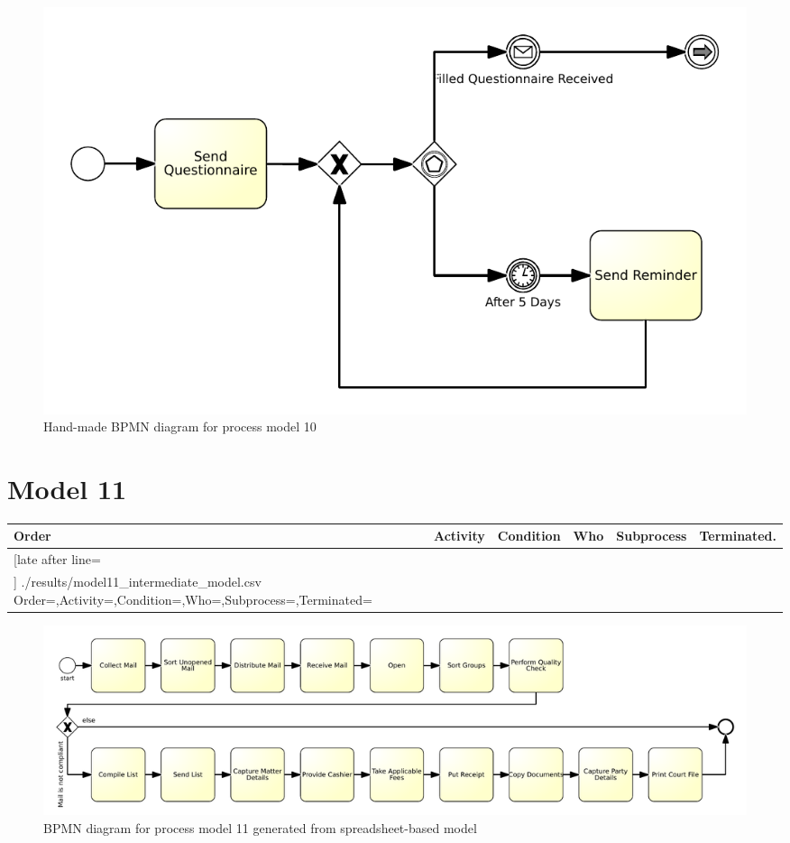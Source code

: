 \begin{figure}[H]
	\centering
	\includegraphics[width=\hsize]{./bpmn/model10.pdf}
	\caption{Hand-made BPMN diagram for process model 10}
	\label{bpmn:model10}
\end{figure}

\section{Model 11}
\begin{tcolorbox}[
	breakable,
	arc=0mm,
	left=1pt,
	right = 1pt,
	boxrule=0mm,
	colback = {white},
	]
	\texttt{}
\end{tcolorbox}
\label{txt:model11}

{\scriptsize
	\begin{longtable}{|p{0.03 \hsize}|p{0.25 \hsize}|p{0.15 \hsize}|p{0.2 \hsize}|p{0.1 \hsize}|p{0.1 \hsize}|}
		\hline
		Order & Activity & Condition & Who & Subprocess & Terminated.
		\\\hline\hline
		\csvreader[late after line=\\\hline]
		{./results/model11_intermediate_model.csv}
		{Order=\Order,Activity=\Activity,Condition=\Condition,Who=\Who,Subprocess=\Subprocess,Terminated=\Terminated}
		{\Order & \Activity & \Condition & \Who & \Subprocess & \Terminated}
		\caption{Spreadsheet-based description for process model 11}
		\label{csv:model11}
	\end{longtable}
}

\begin{figure}[H]
	\centering
	\includegraphics[width=\hsize]{./generated_bpmn/model11.pdf}
	\caption{BPMN diagram for process model 11 generated from spreadsheet-based model}
	\label{bpmn:generated_model11}
\end{figure}

